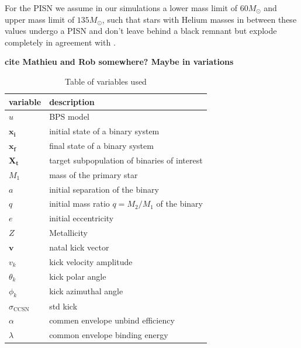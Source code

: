 \documentclass[a4paper,fleqn,usenatbib]{mnras}
\newcommand{\floor}[1]{\textbf{\textcolor{ochre}{#1}}}
\begin{document}
For the PISN we assume in our simulations a lower mass limit of $60  M_{\odot}$ and upper mass limit of $135  M_{\odot}$, such that stars with Helium masses in between these values undergo a PISN and don't leave behind a black remnant but explode completely in agreement with \citet{woosley2017pulsational}. 

\floor{cite Mathieu and Rob somewhere? Maybe in variations}







\begin{table}
\centering
\caption{Table of variables used }
\label{tab:variables}
\begin{tabular}{l|l}
\hline
\textbf{variable}               & \textbf{description}           \\ \hline
\multicolumn{1}{|l|}{$u$} & \multicolumn{1}{l|}{BPS model} \\ \hline
\multicolumn{1}{|l|}{$\mathbf{x_i}$} & \multicolumn{1}{l|}{initial state of a binary system} \\ \hline
\multicolumn{1}{|l|}{$\mathbf{x_f}$} & \multicolumn{1}{l|}{final state of a binary system} \\ \hline
\multicolumn{1}{|l|}{$\mathbf{X_t}$} & \multicolumn{1}{l|}{target subpopulation of binaries of interest} \\ \hline
\multicolumn{1}{|l|}{$M_1$}  & \multicolumn{1}{l|}{mass of the primary star} \\ \hline
\multicolumn{1}{|l|}{$a$} & \multicolumn{1}{l|}{initial separation of the binary } \\ \hline
\multicolumn{1}{|l|}{$q$} & \multicolumn{1}{l|}{initial mass ratio $q = M_2 / M_1 $ of the binary} \\ \hline
\multicolumn{1}{|l|}{$e$} & \multicolumn{1}{l|}{initial eccentricity} \\ \hline
\multicolumn{1}{|l|}{$Z$} & \multicolumn{1}{l|}{Metallicity } \\ \hline
\multicolumn{1}{|l|}{$\mathbf{v}$} & \multicolumn{1}{l|}{natal kick vector} \\ \hline
\multicolumn{1}{|l|}{$v_k$} & \multicolumn{1}{l|}{kick velocity amplitude} \\ \hline
\multicolumn{1}{|l|}{$\theta_k$} & \multicolumn{1}{l|}{kick polar angle} \\ \hline
\multicolumn{1}{|l|}{$\phi_k$} & \multicolumn{1}{l|}{kick azimuthal angle} \\ \hline
\multicolumn{1}{|l|}{$\sigma_{\text{CCSN}}$} & \multicolumn{1}{l|}{std kick} \\ \hline
\multicolumn{1}{|l|}{$\alpha$} & \multicolumn{1}{l|}{commen envelope unbind efficiency} \\ \hline
\multicolumn{1}{|l|}{$\lambda$} & \multicolumn{1}{l|}{common envelope binding energy} \\ \hline
\end{tabular}
\end{table}
\end{document}
